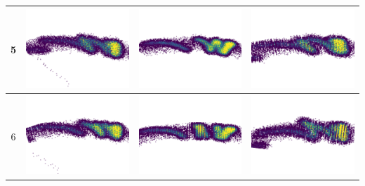 \begin{table}[h]
\begin{tabular}{|c|c|c|c|}
\hline
5 & \includegraphics[scale=0.4]{images/m15.png} & \includegraphics[scale=0.4]{images/m25.png} & \includegraphics[scale=0.4]{images/m35.png}  \\
\hline
6 & \includegraphics[scale=0.4]{images/m16.png} & \includegraphics[scale=0.4]{images/m26.png} & \includegraphics[scale=0.4]{images/m36.png}  \\

\end{tabular}
\end{table}
